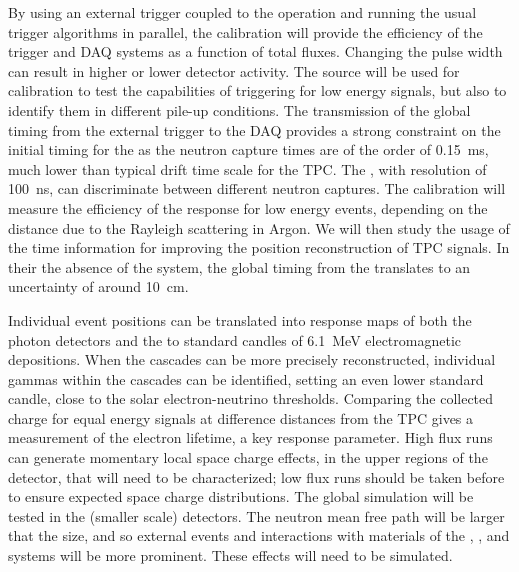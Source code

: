 By using an external trigger coupled to the  operation and running the usual trigger algorithms in parallel, the calibration will provide the efficiency of the trigger and DAQ systems as a function of total fluxes. Changing the pulse width can result in 
higher or lower detector activity. The source will be used for  calibration to test
the capabilities of triggering for low energy signals, but also 
to identify them in different pile-up conditions.
The transmission of the global timing from the external  trigger to the DAQ provides a strong constraint on the initial timing for the 
as the neutron capture times are of the order of 0.15~ms, much lower than typical drift time scale for the TPC. The , with resolution of 100~ns, can discriminate between different neutron captures. The calibration will measure the efficiency of the  response for low energy events, depending on the distance due to the Rayleigh scattering in Argon. We will then study the usage of the  time information for improving the position reconstruction of TPC signals. In their 
the absence of the  system, the global timing from the  translates to an uncertainty of around 10~cm.

Individual event positions can be translated into response maps of both the photon detectors and the  to standard candles of 6.1~MeV electromagnetic depositions. When the cascades can be more precisely reconstructed, individual gammas within the cascades can be identified, setting an even lower standard candle, close to the solar electron-neutrino thresholds. Comparing the collected charge for equal energy signals at difference distances from the TPC gives a measurement of the electron lifetime, a key  response parameter. High  flux runs can generate momentary local space charge effects, in the 
upper regions of the detector, that will need to be characterized; low flux runs should be taken before to ensure 
expected space charge distributions.
The global simulation will be tested in the (smaller scale)  detectors. The neutron mean free path will be larger that the  size, and so 
external events and interactions with materials of the , , and  systems will be more prominent. These effects will need to be simulated.

